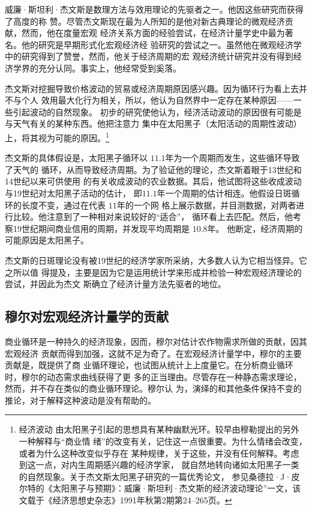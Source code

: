 威廉·斯坦利·杰文斯是数理方法与效用理论的先驱者之一。他因这些研究而获得了高度的称
赞。尽管杰文斯现在最为人所知的是他对新古典理论的微观经济贡献，然而，他在度量宏观
经济关系方面的经验尝试，在经济计量学史中最为著名。他的研究是早期形式化宏观经济经
验研究的尝试之一。虽然他在微观经济学中的研究得到了赞誉，然而，他关于经济周期的宏
观经济统计研究并没有得到经济学界的充分认同。事实上，他经常受到奚落。

杰文斯对挖掘导致价格波动的贸易或经济周期原因感兴趣。因为循环行为看上去并不与个人
效用最大化行为相关，所以，他认为自然界中一定存在某种原因——一些引起波动的自然现象。
初步的研究使他认为，经济活动波动的原因很有可能是与天气有关的某种东西。他把注意力
集中在太阳黑子（太阳活动的周期性波动）上，将其视为可能的原因。\footnote{经济波动
  由太阳黑子引起的思想具有某种幽默光环。较早由穆勒提出的另外一种解释与“商业情
  绪”的改变有关，记住这一点很重要。为什么情绪会改变，或者为什么这种改变似乎存在
  某种规律，关于这些，并没有任何解释。考虑到这一点，对内生周期感兴趣的经济学家，
  就自然地转向诸如太阳黑子一类的自然现象。关于杰文斯太阳黑子研究的一篇优秀论文，
  参见桑德拉·J·皮尔特的《太阳黑子与预期》：威廉·斯坦利·杰文斯的经济波动理论”一文，该
  文载于《经济思想史杂志》1991年秋第2期第24--265页。}

杰文斯的具体假设是，太阳黑子循环以 $11.1$年为一个周期而发生，这些循环导致了天气的
循环，从而导致经济周期。为了验证他的理论，杰文斯着眼于13世纪和14世纪以来可供使用
的有关收成波动的农业数据。其后，他试图将这些收成波动与19世纪对太阳黑子活动的估计，
即$11.1$年一个周期的估计相连。他假设日斑循环的长度不变，通过在代表 $11$年的一个网
格上展示数据，并目测数据，对两者进行比较。他注意到了一种相对来说较好的“适合”，
循环看上去匹配。然后，他考察19世纪期间商业信用的周期，并发现平均周期是 $10.8$年。
他断定，经济周期的可能原因是太阳黑子。

杰文斯的日斑理论没有被19世纪的经济学家所采纳，大多数人认为它相当怪异。它之所以值
得提及，主要是因为它是运用统计学来形成并检验一种宏观经济理论的尝试，并因此为杰文
斯确立了经济计量方法先驱者的地位。

\subsection{穆尔对宏观经济计量学的贡献}

商业循环是一种持久的经济现象，因而，穆尔对估计农作物需求所做的贡献，因其宏观经济
贡献而得到加强，这就不足为奇了。在宏观经济计量学中，穆尔的主要贡献是，既提供了商
业循环理论，也试图从统计上上度量它。在分析商业循环时，穆尔的动态需求曲线获得了更
多的正当理由。尽管存在一种静态需求理论，然而，并不存在类似的商业循环理论。穆尔认
为，演绎的和其他条件保持不变的推论，对于解释这种波动是没有帮助的。

